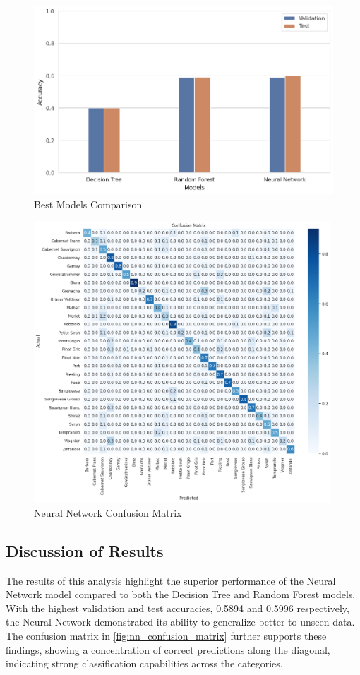 \begin{figure}[H]
    \centering
    \includegraphics[width=0.99\columnwidth]{images/best_model_test_results.png}
    \caption{Best Models Comparison}
    \label{fig:best_models_comparison}
\end{figure}

\begin{figure}
    \centering
    \includegraphics[width=0.99\textwidth]{images/neural_network_confusion_matrix.png}
    \caption{Neural Network Confusion Matrix}
    \label{fig:nn_confusion_matrix}
\end{figure}

\subsection{Discussion of Results}

The results of this analysis highlight the superior
 performance of the Neural Network model compared 
 to both the Decision Tree and Random Forest models. 
 With the highest validation and test accuracies, 
 0.5894 and 0.5996 respectively, the Neural Network 
 demonstrated its ability to generalize better to 
 unseen data. The confusion matrix in \autoref{fig:nn_confusion_matrix} 
 further supports these findings, showing a 
 concentration of correct predictions along the 
 diagonal, indicating strong classification 
 capabilities across the categories.